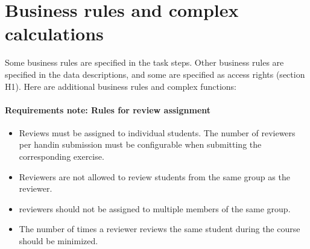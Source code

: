 \documentclass[Main]{subfiles}
\begin{document}
\section{Business rules and complex calculations}
Some business rules are specified in the task steps. Other business rules are specified in the data descriptions, and some are specified as access rights (section H1). Here are additional business rules and complex functions:


\begin{FunctionTable}
\end{FunctionTable}

\paragraph{Requirements note: Rules for review assignment}\label{reqnote:reviewAssignments}
\begin{itemize}
\item Reviews must be assigned to individual students. The number of reviewers per handin submission must be configurable when submitting the corresponding exercise.
\item Reviewers are not allowed to review students from the same group as the reviewer.
\item reviewers should not be assigned to multiple members of the same group.
\item The number of times a reviewer reviews the same student during the course should be minimized. 
\end{itemize}
\end{document}
